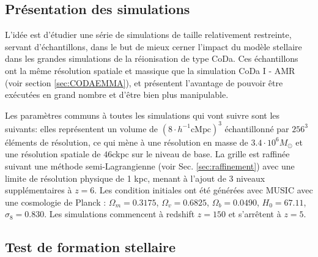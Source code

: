 \subsection{Présentation des simulations}
\label{sec:pres_simu}

L'idée est d'étudier une série de simulations de taille relativement restreinte, servant d'échantillons, dans le but de mieux cerner l'impact du modèle stellaire dans les grandes simulations de la réionisation de type CoDa.
Ces échantillons ont la même résolution spatiale et massique que la simulation CoDa I - AMR (voir section \ref{sec:CODAEMMA}), et présentent l'avantage de pouvoir être exécutées en grand nombre et d'être bien plus manipulable.

Les paramètres communs à toutes les simulations qui vont suivre sont les suivants:
elles représentent un volume de $\left( 8\cdot h^{-1} \mathrm{cMpc} \right)^3$ échantillonné par $256^3$ éléments de résolution, %
ce qui mène à une résolution en masse de $3.4 \cdot 10^6 M_\odot$ et une résolution spatiale de $46$ckpc sur le niveau de base.
La grille est raffinée suivant une méthode semi-Lagrangienne (voir Sec. \ref{sec:raffinement}) avec une limite de résolution  physique de 1 kpc, menant à l'ajout de 3 niveaux supplémentaires à $z=6$.
Les condition initiales ont été générées avec MUSIC \citep{hahn_multi-scale_2011} avec une cosmologie de Planck \citep{planck_collaboration_planck_2016} : 
$\Omega_m=0.3175$, 
$\Omega_v=0.6825$,
$\Omega_b=0.0490$,
$H_0=67.11$,
$\sigma_8=0.830$. 
Les simulations commencent à redshift $z=150$ et s’arrêtent à $z=5$.

\subsection{Test de formation stellaire}

